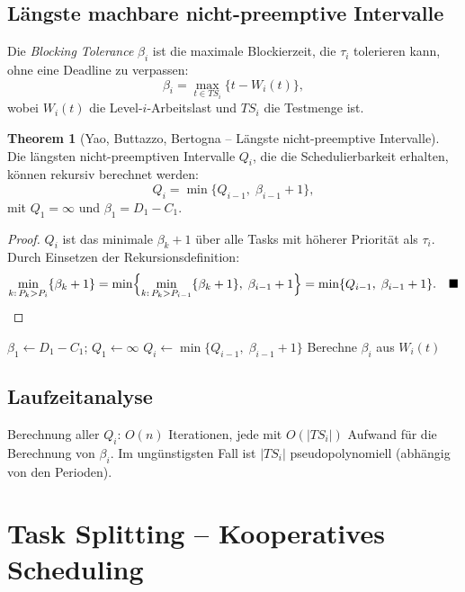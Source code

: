﻿\documentclass[a4paper,12pt]{report}
\theoremstyle{definition}
\newtheorem{theorem}{Theorem}[chapter]
\begin{document}
\subsection{Längste machbare nicht-preemptive Intervalle}

Die \emph{Blocking Tolerance} $\beta_i$ ist die maximale Blockierzeit, die $\tau_i$
tolerieren kann, ohne eine Deadline zu verpassen:
\[
	\beta_i = \max_{t \in TS_i}\{t - W_i(t)\},
\]
wobei $W_i(t)$ die Level-$i$-Arbeitslast und $TS_i$ die Testmenge ist.

\begin{theorem}[Yao, Buttazzo, Bertogna -- Längste nicht-preemptive Intervalle]
	Die längsten nicht-preemptiven Intervalle $Q_i$, die die Schedulierbarkeit
	erhalten, können rekursiv berechnet werden:
	\[
		Q_i = \min\{Q_{i-1},\; \beta_{i-1} + 1\},
	\]
	mit $Q_1 = \infty$ und $\beta_1 = D_1 - C_1$.
\end{theorem}

\begin{proof}
	$Q_i$ ist das minimale $\beta_k + 1$ über alle Tasks mit höherer Priorität als
	$\tau_i$. Durch Einsetzen der Rekursionsdefinition:
	\[
		\min_{k:\,P_k > P_i}\{\beta_k + 1\}
		= \min\Bigl\{\min_{k:\,P_k > P_{i-1}}\{\beta_k + 1\},\; \beta_{i-1} + 1\Bigr\}
		= \min\{Q_{i-1},\; \beta_{i-1} + 1\}. \quad\blacksquare
	\]
\end{proof}

\begin{algorithm}[H]
	\caption{Berechnung der längsten nicht-preemptiven Intervalle}
	\begin{algorithmic}[1]
		\State $\beta_1 \leftarrow D_1 - C_1$; $Q_1 \leftarrow \infty$
		\State $Q_i \leftarrow \min\{Q_{i-1},\; \beta_{i-1} + 1\}$
		\State Berechne $\beta_i$ aus $W_i(t)$
		\EndFor
	\end{algorithmic}
\end{algorithm}

\subsection{Laufzeitanalyse}

Berechnung aller $Q_i$: $O(n)$ Iterationen, jede mit $O(|\mathit{TS}_i|)$ Aufwand
für die Berechnung von $\beta_i$. Im ungünstigsten Fall ist $|\mathit{TS}_i|$
pseudopolynomiell (abhängig von den Perioden).

\section{Task Splitting -- Kooperatives Scheduling}
\end{document}
